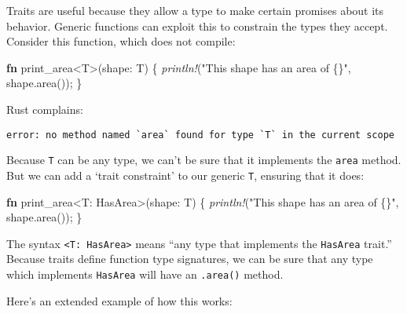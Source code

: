 \documentclass[a4paper,]{book}
\newenvironment{Shaded}{\begin{snugshade}}{\end{snugshade}}
\newcommand{\KeywordTok}[1]{\textcolor[rgb]{0.13,0.29,0.53}{\textbf{{#1}}}}
\newcommand{\StringTok}[1]{\textcolor[rgb]{0.31,0.60,0.02}{{#1}}}
\newcommand{\PreprocessorTok}[1]{\textcolor[rgb]{0.56,0.35,0.01}{\textit{{#1}}}}
\newcommand{\NormalTok}[1]{{#1}}
\begin{document}
Traits are useful because they allow a type to make certain promises
about its behavior. Generic functions can exploit this to constrain the
types they accept. Consider this function, which does not compile:

\begin{Shaded}
\begin{Highlighting}[]
\KeywordTok{fn} \NormalTok{print_area<T>(shape: T) \{}
    \PreprocessorTok{println!}\NormalTok{(}\StringTok{"This shape has an area of \{\}"}\NormalTok{, shape.area());}
\NormalTok{\}}
\end{Highlighting}
\end{Shaded}

Rust complains:

\begin{verbatim}
error: no method named `area` found for type `T` in the current scope
\end{verbatim}

Because \texttt{T} can be any type, we can't be sure that it implements
the \texttt{area} method. But we can add a `trait constraint' to our
generic \texttt{T}, ensuring that it does:

\begin{Shaded}
\begin{Highlighting}[]
\KeywordTok{fn} \NormalTok{print_area<T: HasArea>(shape: T) \{}
    \PreprocessorTok{println!}\NormalTok{(}\StringTok{"This shape has an area of \{\}"}\NormalTok{, shape.area());}
\NormalTok{\}}
\end{Highlighting}
\end{Shaded}

The syntax \texttt{\textless{}T:\ HasArea\textgreater{}} means ``any
type that implements the \texttt{HasArea} trait.'' Because traits define
function type signatures, we can be sure that any type which implements
\texttt{HasArea} will have an \texttt{.area()} method.

Here's an extended example of how this works:
\end{document}
